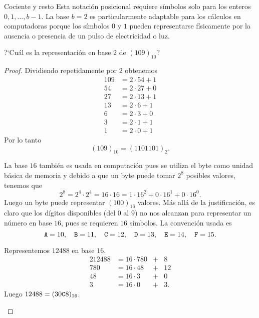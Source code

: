 \begin{section}{Cociente y resto}
Esta notación posicional requiere símbolos solo para los enteros
$0, 1,\ldots,b-1$. La base $b=2$ es particularmente adaptable para
los cálculos en computadoras porque los símbolos $0$ y $1$ pueden
representarse físicamente por la ausencia o presencia de un pulso
de electricidad o luz. 


\begin{ejemplo} ?`Cuál es la representación en base $2$ de
$(109)_{10}$?
\end{ejemplo}
\begin{proof} Dividiendo repetidamente por $2$ obtenemos
$$\begin{aligned}
109&=2\cdot 54+1\\ 54&=2\cdot 27+0\\ 27&=2\cdot 13+1\\ 13&=2\cdot 6+1\\
6&=2\cdot 3+0 \\ 3&=2\cdot 1+1 \\1&=2\cdot 0+1
\end{aligned}
$$
Por lo tanto
$$ (109)_{10} = (1101101)_2.
$$

La base $16$ también es usada en computación pues se utiliza el byte como unidad básica de memoria y debido a que un byte puede tomar
$2^8$ posibles valores, tenemos que $$2^8 = 2^4 \cdot 2^4 = 16 \cdot 16 = 1 \cdot 16^2 + 0 \cdot 16^1 + 0 \cdot 16^0.$$ Luego 
 un byte puede representar $(100)_{16}$ valores. Más allá de la justificación, es claro que los dígitos disponibles (del $0$  al $9$) no nos alcanzan  para representar un  número en base $16$, pues se requieren $16$ símbolos. La convención usada es 
 $${\tt A}=10,\quad {\tt B}=11,\quad {\tt C} =12,\quad {\tt D} = 13,\quad {\tt E} = 14,\quad {\tt F} = 15.$$

\begin{ejemplo} Representemos  $12488$ en  base $16$.
\begin{alignat*}2
12488 &= 16 \cdot 780 &+&  8\\
780 & = 16 \cdot 48 &+& 12\\
48 & = 16\cdot 3 &+& 0\\
3 & = 16 \cdot 0  &+& 3.
\end{alignat*}
Luego $12488 = (30{\tt C}8)_{16}$.
\end{ejemplo}


\end{proof}




\end{section}
